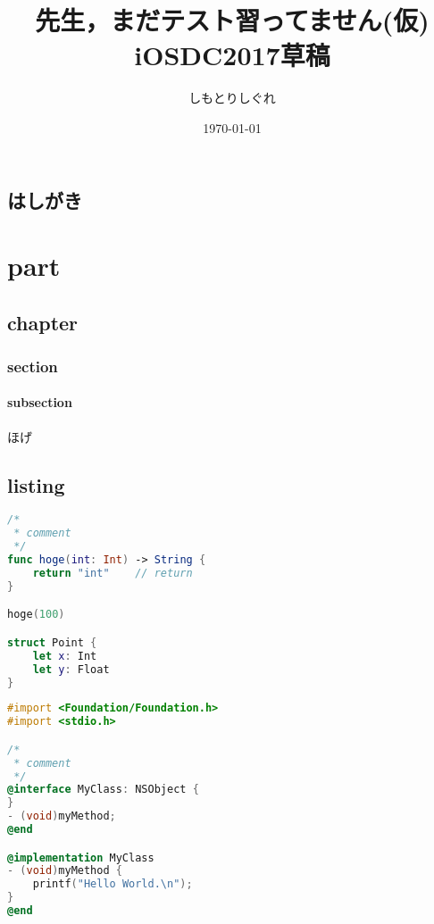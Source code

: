 \documentclass[10pt,twoside,openright]{jsbook}
\title{%
    先生，まだテスト習ってません(仮) \\
    \large iOSDC2017草稿}
\author[$\dagger$]{しもとりしぐれ}
\affil[$\dagger$]{@S\_Shimotori}
\date{\today}
\newcommand\blankpage{%
    \null
    \thispagestyle{empty}
    \addtocounter{page}{-1}
    \newpage
}
\begin{document}
\maketitle
\restoregeometry

\afterpage{\blankpage}


\tableofcontents
\thispagestyle{plain}

\chapter*{はしがき}
\thispagestyle{plain}


\cleardoublepage
{}


\part{part}
\restoregeometry

\chapter{chapter}
\thispagestyle{plain}
\section{section}
\subsection{subsection}
ほげ\cite{hoge}
\chapter{listing}
\thispagestyle{plain}
\begin{lstlisting}[language=swift,caption=キャプション,label=ラベル]
/*
 * comment
 */
func hoge(int: Int) -> String {
    return "int"    // return
}

hoge(100)

struct Point {
    let x: Int
    let y: Float
}
\end{lstlisting}
\begin{lstlisting}[language=objectivec,caption=キャプション,label=ラベル]
#import <Foundation/Foundation.h>
#import <stdio.h>

/*
 * comment
 */
@interface MyClass: NSObject {
}
- (void)myMethod;
@end

@implementation MyClass
- (void)myMethod {
    printf("Hello World.\n");
}
@end
\end{lstlisting}
\end{document}
